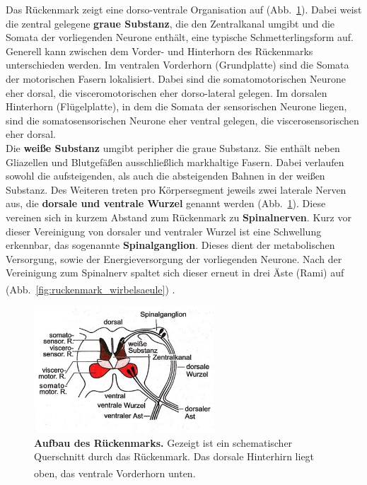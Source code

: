 \documentclass[12pt,a4paper,pdftex]{article}
\begin{document}
Das Rückenmark zeigt eine dorso-ventrale Organisation auf (Abb.~\ref{fig:ruckenmark_schema}). Dabei weist die zentral gelegene \textbf{graue Substanz}, die den Zentralkanal umgibt und die Somata der vorliegenden Neurone enthält, eine typische Schmetterlingsform auf. Generell kann zwischen dem Vorder- und Hinterhorn des Rückenmarks unterschieden werden. Im ventralen Vorderhorn (Grundplatte) sind die Somata der motorischen Fasern lokalisiert. Dabei sind die somatomotorischen Neurone eher dorsal, die visceromotorischen eher dorso-lateral gelegen. Im dorsalen Hinterhorn (Flügelplatte), in dem die Somata der sensorischen Neurone liegen, sind die somatosensorischen Neurone eher ventral gelegen, die viscerosensorischen eher dorsal.\\

\noindent Die \textbf{weiße Substanz} umgibt peripher die graue Substanz. Sie enthält neben Gliazellen und Blutgefäßen ausschließlich markhaltige Fasern. Dabei verlaufen sowohl die aufsteigenden, als auch die absteigenden Bahnen in der weißen Substanz. Des Weiteren treten pro Körpersegment jeweils zwei laterale Nerven aus, die \textbf{dorsale und ventrale Wurzel} genannt werden (Abb.~\ref{fig:ruckenmark_schema}). Diese vereinen sich in kurzem Abstand zum Rückenmark zu \textbf{Spinalnerven}. Kurz vor dieser Vereinigung von dorsaler und ventraler Wurzel ist eine Schwellung erkennbar, das sogenannte \textbf{Spinalganglion}. Dieses dient der metabolischen Versorgung, sowie der Energieversorgung der vorliegenden Neurone. Nach der Vereinigung zum Spinalnerv spaltet sich dieser erneut in drei Äste (Rami) auf (Abb.~\ref{fig:ruckenmark_wirbelsaeule}) \textsuperscript{\cite[14]{penzlin2005tierphys}}.

\begin{figure}[H]
     \centering
     \includegraphics[width=0.6\textwidth]{pictures/Bilder_Jule/Andere/rueckenmark_schema.jpg}
     \caption[Aufbau des Rückenmarks]{\textbf{Aufbau des Rückenmarks.} Gezeigt ist ein schematischer Querschnitt durch das Rückenmark. Das dorsale Hinterhirn liegt oben, das ventrale Vorderhorn unten. \textsuperscript{\cite[14]{penzlin2005tierphys}}}
     \label{fig:ruckenmark_schema}
 \end{figure}{}
\end{document}
